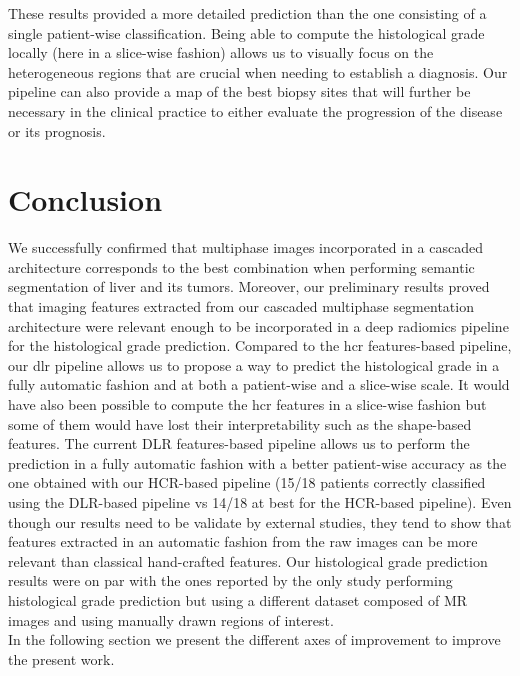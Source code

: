 These results provided a more detailed prediction than the one
consisting of a single patient-wise classification. Being able to
compute the histological grade locally (here in a slice-wise fashion)
allows us to visually focus on the heterogeneous regions that are
crucial when needing to establish a diagnosis. Our pipeline can also
provide a map of the best biopsy sites that will further be necessary in
the clinical practice to either evaluate the progression of the disease
or its prognosis.\\


\section{Conclusion}


We successfully confirmed that multiphase images incorporated in a cascaded architecture corresponds to the best combination when performing semantic segmentation of liver and its tumors. Moreover, our preliminary results proved that imaging features extracted from our cascaded multiphase segmentation architecture were relevant enough to be incorporated in a deep radiomics pipeline for the histological grade prediction. 
Compared to the \ac{hcr} features-based pipeline, our \ac{dlr} pipeline allows us to propose a way to predict the histological grade in a fully automatic fashion and at both a patient-wise and a slice-wise scale. 
It would have also been possible to compute the \ac{hcr} features in a slice-wise fashion but some of them would have lost their interpretability such as the shape-based features. The current DLR features-based pipeline allows us to perform the prediction in a fully automatic fashion with a better patient-wise accuracy as the one obtained with our HCR-based pipeline (15/18 patients correctly classified using the DLR-based pipeline vs 14/18 at best for the HCR-based pipeline).
Even though our results need to be validate by external studies, they tend to show that features extracted in an automatic fashion from the raw images can be more relevant than classical hand-crafted features.
Our histological grade prediction results were on par with the ones reported by the only study performing histological grade prediction but using a different dataset composed of MR images and using manually drawn regions of interest.\\
In the following section we present the different axes of improvement to improve the present work.


